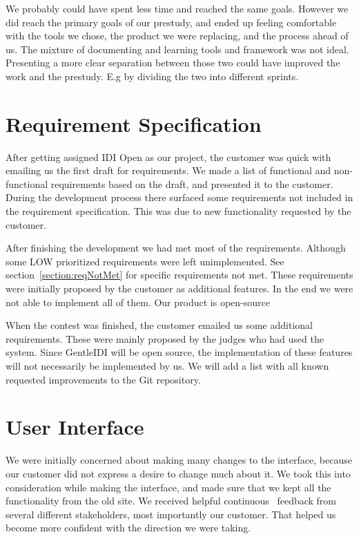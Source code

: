 We probably could have spent less time and reached the same goals.
However we did reach the primary goals of our prestudy, and ended up
feeling comfortable with the tools we chose, the product we were
replacing, and the process ahead of us. The mixture of documenting and
learning tools and framework was not ideal. Presenting a more clear
separation between those two could have improved the work and the
prestudy. E.g by dividing the two into different sprints.

\section{Requirement Specification}

After getting assigned IDI Open as our project, the customer was quick
with emailing us the first draft for requirements. We made a list of
functional and non-functional requirements based on the draft, and
presented it to the customer. During the development process there
surfaced some requirements not included in the requirement
specification. This was due to new functionality requested by the
customer. 

After finishing the development we had met most of the requirements.
Although some LOW prioritized requirements were left unimplemented. See
section~\ref{section:reqNotMet} for specific requirements not met. These
requirements were initially proposed by the customer as additional
features. In the end we were not able to implement all of them. Our
product is open-source 

When the contest was finished, the customer emailed us some additional
requirements. These were mainly proposed by the judges who had used the
system. Since GentleIDI will be open source, the implementation of
these features will not necessarily be implemented by us. We will add a
list with all known requested improvements to the Git repository. 

\section{User Interface}

We were initially concerned about making many changes to the interface,
because our customer did not express a desire to change much about it.
We took this into consideration while making the interface, and made
sure that we kept all the functionality from the old site. We received
helpful continuous \ feedback from several different stakeholders, most
importantly our customer. That helped us become more confident with the
direction we were taking. 

